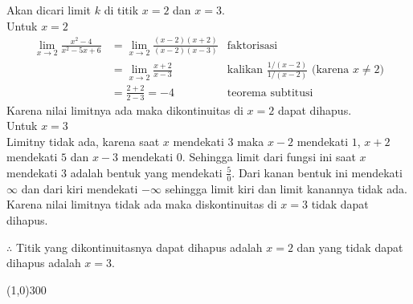 \begin{enumerate}[leftmargin=*, label={\arabic*}.]
\begin{enumerate}[label={\alph*}.]
Akan dicari limit $k$ di titik $x=2$ dan $x=3$.\\
Untuk $x=2$
\begin{align*}
    \lim_{x \to 2} \frac{x^{2}-4}{x^{2}-5x+6}
    &= \lim_{x \to 2} \frac{(x-2)(x+2)}{(x-2)(x-3)}
    &\text{faktorisasi}\\
    &= \lim_{x \to 2} \frac{x+2}{x-3}
    &\text{kalikan $\frac{1/(x-2)}{1/(x-2)}$ (karena $x \neq 2$)}\\
    &= \frac{2+2}{2-3} = -4
    &\text{teorema subtitusi}
\end{align*}
Karena nilai limitnya ada maka dikontinuitas di $x=2$ dapat dihapus.\\
Untuk $x=3$\\
Limitny tidak ada, karena saat $x$ mendekati $3$ maka $x-2$ mendekati $1$, 
$x+2$ mendekati $5$ dan $x-3$ mendekati 0. Sehingga limit dari fungsi ini 
saat $x$ mendekati $3$ adalah bentuk yang mendekati $\frac{5}{0}$. Dari kanan 
bentuk ini mendekati $\infty$ dan dari kiri mendekati $-\infty$ sehingga limit 
kiri dan limit kanannya tidak ada.\\
Karena nilai limitnya tidak ada maka diskontinuitas di $x=3$ tidak dapat dihapus.

$\therefore$ Titik yang dikontinuitasnya dapat dihapus adalah $x=2$ dan yang tidak 
dapat dihapus adalah $x=3$.
\begin{center}
    \line(1,0){300}
\end{center}
\end{enumerate}
\end{enumerate}
